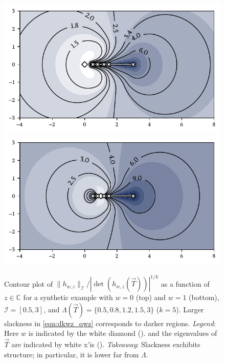\begin{figure}
    \begin{center}
        \includegraphics{imgs/ch7_hwz1.pdf} 
        \includegraphics{imgs/ch7_hwz2.pdf} 
    \end{center}
     \caption[{Contour plot of \( \|h_{w,z}\|_{\mathcal{I}} / |\!\det(h_{w,z}(\vec{T}))|^{1/k} \) as a function of $z \in \mathbb{C}$}]{%
         Contour plot of \( \|h_{w,z}\|_{\mathcal{I}} / |\!\det(h_{w,z}(\vec{T}))|^{1/k} \) as a function of $z \in \mathbb{C}$ for a synthetic example with \( w=0 \) (top) and \( w=1 \) (bottom), \( \mathcal{I} = [0.5,3] \), and \( \Lambda(\vec{T}) = \{ 0.5,0.8,1.2,1.5,3 \} \) ($k=5$).
    Larger slackness in \cref{eqn:dkwz_qwz} corresponds to darker regions. 
    \hspace{.25em}\emph{Legend}:
    Here \( w \) is indicated by the white diamond 
    ({\protect{}}). 
    and the eigenvalues of \( \vec{T} \) are indicated by white x'is 
    ({\protect{}}). 
    \hspace{.25em}\emph{Takeaway}: Slackness exchibits structure; in particular, it is lower far from \( \Lambda \). 
    }
    \label{fig:ch7_hwz}
\end{figure}


